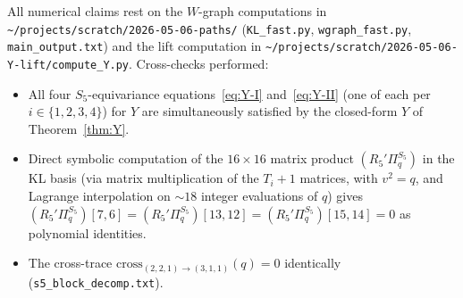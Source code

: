 \documentclass[11pt]{article}
\theoremstyle{definition}
\begin{document}
All numerical claims rest on the $W$-graph computations in \texttt{\textasciitilde/projects/scratch/2026-05-06-paths/} (\texttt{KL\_fast.py}, \texttt{wgraph\_fast.py}, \texttt{main\_output.txt}) and the lift computation in \texttt{\textasciitilde/projects/scratch/2026-05-06-Y-lift/compute\_Y.py}. Cross-checks performed:
\begin{itemize}[leftmargin=2em,topsep=0.1em,itemsep=0.1em]
\item All four $S_5$-equivariance equations~\eqref{eq:Y-I} and~\eqref{eq:Y-II} (one of each per $i \in \{1,2,3,4\}$) for $Y$ are simultaneously satisfied by the closed-form $Y$ of Theorem~\ref{thm:Y}.
\item Direct symbolic computation of the $16 \times 16$ matrix product $(R_5'\Pi_q^{S_5})$ in the KL basis (via matrix multiplication of the $T_i+1$ matrices, with $v^2 = q$, and Lagrange interpolation on $\sim 18$ integer evaluations of $q$) gives $(R_5'\Pi_q^{S_5})[7, 6] = (R_5'\Pi_q^{S_5})[13, 12] = (R_5'\Pi_q^{S_5})[15, 14] = 0$ as polynomial identities.
\item The cross-trace $\mathrm{cross}_{(2,2,1)\to(3,1,1)}(q) = 0$ identically (\texttt{s5\_block\_decomp.txt}).
\end{itemize}
\end{document}
